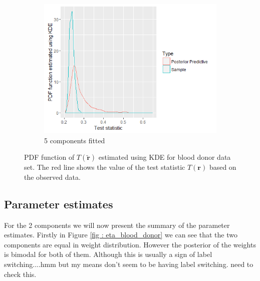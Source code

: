 \begin{figure}[!htb]
\begin{subfigure}[b]{0.4\textwidth}
		\includegraphics[width=\textwidth]{mainmatter/chapter_6_blood_donor/ppc_5comp.png}	
          \caption{\label{fig : ppc_blood_donor_5comp}5 components fitted}
	\end{subfigure}
	
	\caption{PDF function of $T(\boldsymbol{\tilde{r}})$ estimated using KDE for blood donor data set. The red line shows the value of the test statistic $T(\boldsymbol{r})$ based on the observed data.}
	\label{fig : ppc_blood_donor}    
\end{figure} 

\subsection{Parameter estimates}
For the 2 components we will now present the summary of the parameter estimates. Firstly in Figure \ref{fig : eta_blood_donor} we can see that the two components are equal in weight distribution. However the posterior of the weights is bimodal for both of them. Although this is usually a sign of label switching....hmm but my means don't seem to be having label switching. need to check this.

